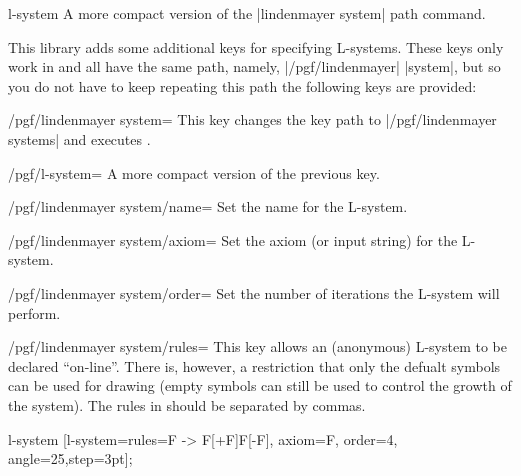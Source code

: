 \begin{pathoperation}{l-system}{ }
  A more compact version of the |lindenmayer system| path command.
\end{pathoperation}

This library adds some additional keys for specifying L-systems.
These keys only work in \tikzname{} and all
have the same path, namely, |/pgf/lindenmayer| |system|, but so 
you do not have to keep repeating this path the following keys are 
provided:
 
\begin{stylekey}{/pgf/lindenmayer system=}
This key changes the key path to |/pgf/lindenmayer systems| and
executes .
\end{stylekey}

\begin{stylekey}{/pgf/l-system=}
A more compact version of the previous key.
\end{stylekey}

\begin{key}{/pgf/lindenmayer system/name=}
  Set the name for the L-system. 
\end{key}

\begin{key}{/pgf/lindenmayer system/axiom=}
  Set the axiom (or input string) for the L-system. 
\end{key}

\begin{key}{/pgf/lindenmayer system/order=}
  Set the number of iterations the L-system will perform.
\end{key}

\begin{key}{/pgf/lindenmayer system/rules=}
  This key allows an (anonymous) L-system to be declared ``on-line''.
  There is, however, a restriction that only the defualt symbols can be
  used for drawing (empty symbols can still be used to control
  the growth of the system). The rules in  should
  be separated by commas.
  
\begin{codeexample}[]
\tikz[rotate=65] l-system
  [l-system={rules={F -> F[+F]F[-F]}, axiom=F, order=4, angle=25,step=3pt}];
\end{codeexample} 
\end{key}

